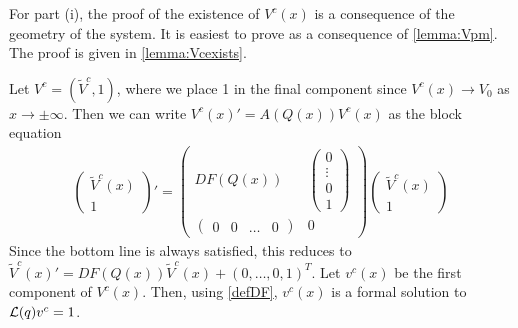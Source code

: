 \documentclass[thesis.tex]{subfiles}
\begin{document}
For part (i), the proof of the existence of $V^c(x)$ is a consequence of the geometry of the system. It is easiest to prove as a consequence of \cref{lemma:Vpm}. The proof is given in \cref{lemma:Vcexists}.

Let $V^c = (\tilde{V}^c, 1)$, where we place 1 in the final component since $V^c(x) \rightarrow V_0$ as $x \rightarrow \pm \infty$. Then we can write $V^c(x)' = A(Q(x))V^c(x)$ as the block equation
\begin{align*}
\begin{pmatrix}\tilde{V}^c(x) \\ 1 \end{pmatrix}' = 
\begin{pmatrix}
DF(Q(x)) & \begin{pmatrix} 0 \\ \vdots \\ 0 \\ 1 \end{pmatrix} \\
\begin{pmatrix} 0 & 0 & \dots & 0 \end{pmatrix} & 0
\end{pmatrix} 
\begin{pmatrix}\tilde{V}^c(x) \\ 1 \end{pmatrix}
\end{align*}
Since the bottom line is always satisfied, this reduces to $\tilde{V}^c(x)' = DF(Q(x)) \tilde{V}^c(x) + (0, \dots, 0, 1)^T$. Let $v^c(x)$ be the first component of $V^c(x)$. Then, using \eqref{defDF}, $v^c(x)$ is a formal solution to $\mathcal{L}(q)v^c = 1$.
\end{document}
